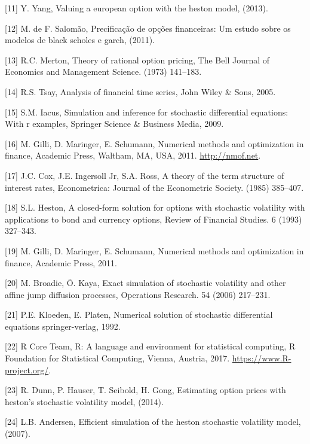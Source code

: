 \documentclass[12pt,twoside]{reedthesis}
\theoremstyle{definition}
\theoremstyle{definition}
\theoremstyle{remark}
\begin{document}
  \hypertarget{ref-yang2013valuing}{}
  {[}11{]} Y. Yang, Valuing a european option with the heston model,
  (2013).
  
  \hypertarget{ref-salomao2011precificaccao}{}
  {[}12{]} M. de F. Salomão, Precificação de opções financeiras: Um estudo
  sobre os modelos de black scholes e garch, (2011).
  
  \hypertarget{ref-merton1973theory}{}
  {[}13{]} R.C. Merton, Theory of rational option pricing, The Bell
  Journal of Economics and Management Science. (1973) 141--183.
  
  \hypertarget{ref-tsay2005analysis}{}
  {[}14{]} R.S. Tsay, Analysis of financial time series, John Wiley \&
  Sons, 2005.
  
  \hypertarget{ref-iacus2009simulation}{}
  {[}15{]} S.M. Iacus, Simulation and inference for stochastic
  differential equations: With r examples, Springer Science \& Business
  Media, 2009.
  
  \hypertarget{ref-nmof}{}
  {[}16{]} M. Gilli, D. Maringer, E. Schumann, Numerical methods and
  optimization in finance, Academic Press, Waltham, MA, USA, 2011.
  \url{http://nmof.net}.
  
  \hypertarget{ref-cox1985theory}{}
  {[}17{]} J.C. Cox, J.E. Ingersoll Jr, S.A. Ross, A theory of the term
  structure of interest rates, Econometrica: Journal of the Econometric
  Society. (1985) 385--407.
  
  \hypertarget{ref-heston1993closed}{}
  {[}18{]} S.L. Heston, A closed-form solution for options with stochastic
  volatility with applications to bond and currency options, Review of
  Financial Studies. 6 (1993) 327--343.
  
  \hypertarget{ref-gilli_numerical_2011}{}
  {[}19{]} M. Gilli, D. Maringer, E. Schumann, Numerical methods and
  optimization in finance, Academic Press, 2011.
  
  \hypertarget{ref-broadie2006exact}{}
  {[}20{]} M. Broadie, Ö. Kaya, Exact simulation of stochastic volatility
  and other affine jump diffusion processes, Operations Research. 54
  (2006) 217--231.
  
  \hypertarget{ref-kloeden1992}{}
  {[}21{]} P.E. Kloeden, E. Platen, Numerical solution of stochastic
  differential equations springer-verlag, 1992.
  
  \hypertarget{ref-rlang}{}
  {[}22{]} R Core Team, R: A language and environment for statistical
  computing, R Foundation for Statistical Computing, Vienna, Austria,
  2017. \url{https://www.R-project.org/}.
  
  \hypertarget{ref-dunn2014estimating}{}
  {[}23{]} R. Dunn, P. Hauser, T. Seibold, H. Gong, Estimating option
  prices with heston's stochastic volatility model, (2014).
  
  \hypertarget{ref-andersen2007efficient}{}
  {[}24{]} L.B. Andersen, Efficient simulation of the heston stochastic
  volatility model, (2007).


\end{document}
